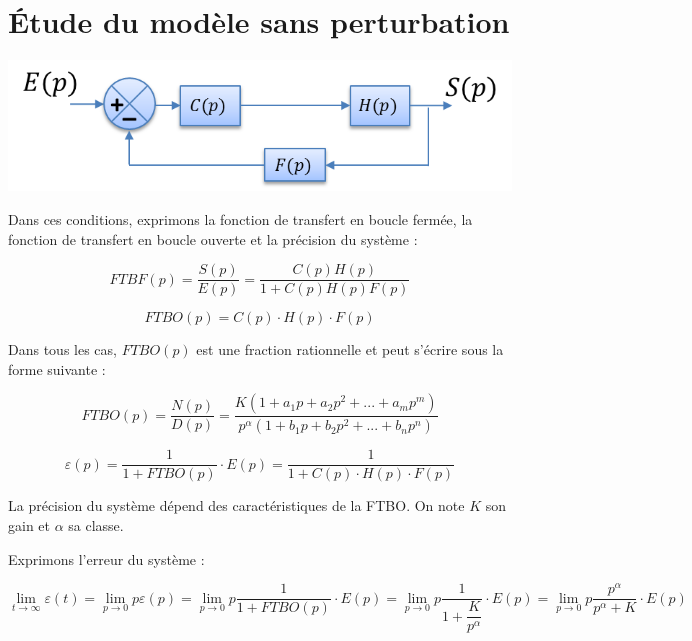 \documentclass[10pt,oneside]{article}
\begin{document}
\section{Étude du modèle sans perturbation}


\begin{minipage}[c]{.48\linewidth}
\begin{center}
\includegraphics[width=.95\textwidth]{png/bloc11}
\end{center}
\end{minipage}\hfill
\begin{minipage}[c]{.48\linewidth}
Dans ces conditions, exprimons la fonction de transfert en boucle fermée, la fonction de transfert en boucle ouverte et la précision du système :

$$
FTBF(p)
=\dfrac{S(p)}{E(p)}
=\dfrac{C(p)H(p)}{1+C(p)H(p)F(p)}
$$

\end{minipage}


$$
FTBO(p) = C(p) \cdot H(p) \cdot F(p)
$$


Dans tous les cas, $FTBO(p)$ est une fraction rationnelle et peut s'écrire sous la forme suivante : 

$$
FTBO(p)=\dfrac{N(p)}{D(p)}=\dfrac{K\left(1+a_1p +a_2p^2 + ... + a_m p^m \right)}{p^\alpha \left(1+b_1p +b_2p^2 + ... + b_n p^n \right)}
$$


$$
\varepsilon(p)
=\dfrac{1}{1+FTBO(p)} \cdot E(p)
=\dfrac{1}{1+C(p) \cdot H(p) \cdot F(p)} 
$$

\begin{rem}
La précision du système dépend des caractéristiques de la FTBO. On note $K$ son gain et $\alpha$ sa classe.
\end{rem}


Exprimons l'erreur du système :

$$
\lim\limits_{t\to \infty} \varepsilon(t) = \lim\limits_{p\to 0} p \varepsilon(p)
= \lim\limits_{p\to 0} p \dfrac{1}{1+FTBO(p)} \cdot E(p)
= \lim\limits_{p\to 0} p \dfrac{1}{1+\dfrac{K}{p^\alpha}} \cdot E(p)
= \lim\limits_{p\to 0} p \dfrac{p^\alpha}{p^\alpha+K} \cdot E(p)
$$
\end{document}
